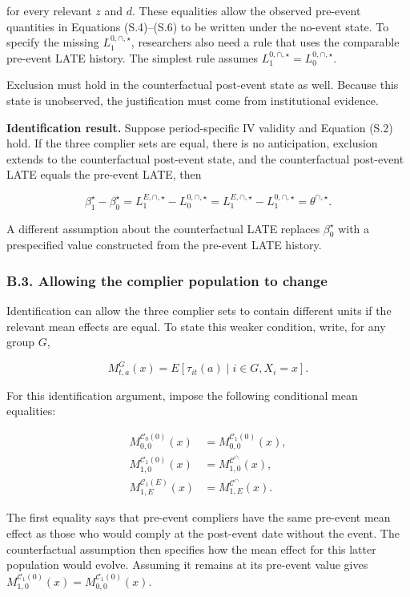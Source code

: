 \documentclass[
  11pt,
]{article}
\begin{document}
for every relevant \(z\) and \(d\). These equalities allow the observed
pre-event quantities in Equations (S.4)--(S.6) to be written under the
no-event state. To specify the missing \(L_1^{0,\cap,\star}\),
researchers also need a rule that uses the comparable pre-event LATE
history. The simplest rule assumes
\(L_1^{0,\cap,\star}=L_0^{0,\cap,\star}\).

Exclusion must hold in the counterfactual post-event state as well.
Because this state is unobserved, the justification must come from
institutional evidence.

\textbf{Identification result.} Suppose period-specific IV validity and
Equation (S.2) hold. If the three complier sets are equal, there is no
anticipation, exclusion extends to the counterfactual post-event state,
and the counterfactual post-event LATE equals the pre-event LATE, then

\[
\beta_1^\star-\beta_0^\star
=L_1^{E,\cap,\star}-L_0^{0,\cap,\star}
=L_1^{E,\cap,\star}-L_1^{0,\cap,\star}
=\theta^{\cap,\star}.
\tag{S.6}
\]

A different assumption about the counterfactual LATE replaces
\(\beta_0^\star\) with a prespecified value constructed from the
pre-event LATE history.

\hypertarget{b.3.-allowing-the-complier-population-to-change}{%
\subsubsection{B.3. Allowing the complier population to
change}\label{b.3.-allowing-the-complier-population-to-change}}

Identification can allow the three complier sets to contain different
units if the relevant mean effects are equal. To state this weaker
condition, write, for any group \(G\),

\[
M_{t,a}^{G}(x)
=E[\tau_{it}(a)\mid i\in G,X_i=x].
\]

For this identification argument, impose the following conditional mean
equalities:

\[
\begin{aligned}
M_{0,0}^{\mathcal C_0(0)}(x)
&=M_{0,0}^{\mathcal C_1(0)}(x),\\
M_{1,0}^{\mathcal C_1(0)}(x)
&=M_{1,0}^{\mathcal C^\cap}(x),\\
M_{1,E}^{\mathcal C_1(E)}(x)
&=M_{1,E}^{\mathcal C^\cap}(x).
\end{aligned}
\tag{S.7}
\]

The first equality says that pre-event compliers have the same pre-event
mean effect as those who would comply at the post-event date without the
event. The counterfactual assumption then specifies how the mean effect
for this latter population would evolve. Assuming it remains at its
pre-event value gives
\(M_{1,0}^{\mathcal C_1(0)}(x)=M_{0,0}^{\mathcal C_1(0)}(x)\).
\end{document}
